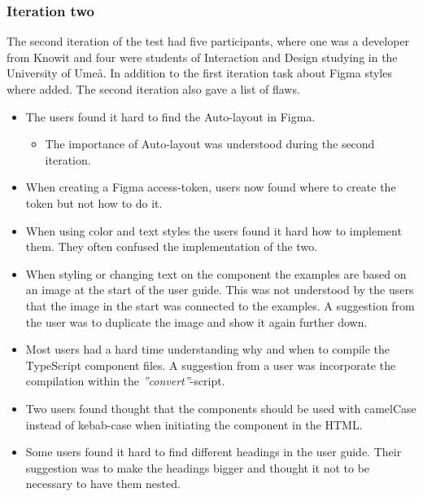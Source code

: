 \subsubsection{Iteration two}%
\label{ssub:Iteration two}

The second iteration of the test had five participants, where one was a developer from Knowit and four were students of Interaction and Design studying in the University of Umeå. In addition to the first iteration task about Figma styles where added. The second iteration also gave a list of flaws.


\begin{itemize}
   \item The users found it hard to find the Auto-layout in Figma.
      \begin{itemize}
         \item The importance of Auto-layout was understood during the second iteration.
      \end{itemize}
   \item When creating a Figma access-token, users now found where to create the token but not how to do it.
   \item When using color and text styles the users found it hard how to implement them. They often confused the implementation of the two. 
   \item When styling or changing text on the component the examples are based on an image at the start of the user guide. This was not understood by the users that the image in the start was connected to the examples. A suggestion from the user was to duplicate the image and show it again further down.
   \item Most users had a hard time understanding why and when to compile the TypeScript component files. A suggestion from a user was incorporate the compilation within the \textit{''convert''}-script.
   \item Two users found thought that the components should be used with camelCase instead of kebab-case when initiating the component in the HTML.
   \item Some users found it hard to find different headings in the user guide. Their suggestion was to make the headings bigger and thought it not to be necessary to have them nested.
\end{itemize}


